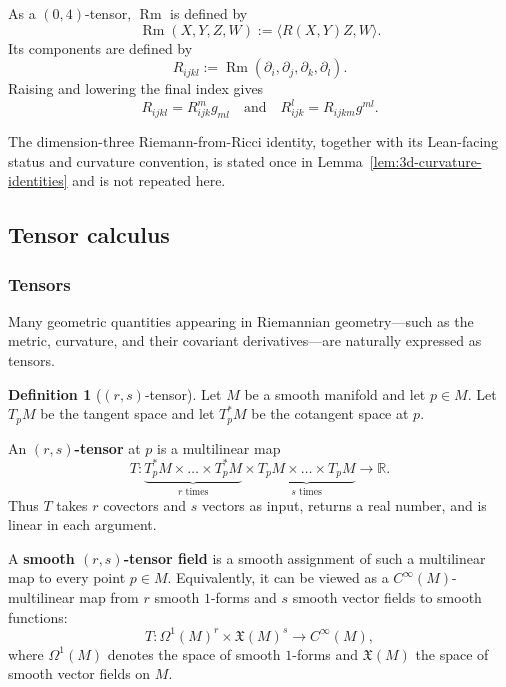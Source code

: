 \documentclass[11pt]{article}
\theoremstyle{plain}
\theoremstyle{definition}
\newtheorem{definition}[theorem]{Definition}
\theoremstyle{remark}
\newcommand{\Rm}{\operatorname{Rm}}
\begin{document}
As a $(0,4)$-tensor, $\Rm$ is defined by
\begin{equation}
    \Rm(X,Y,Z,W) := \langle R(X,Y)Z,W \rangle .
\end{equation}
Its components are defined by
\begin{equation}
    R_{ijkl} :=\Rm(\partial_i,\partial_j,\partial_k,\partial_l) .
\end{equation}
Raising and lowering the final index gives
\begin{equation}
    R_{ijkl}=R_{ijk}^m g_{ml} \quad \text{and} \quad R_{ijk}^l = R_{ijkm} g^{ml} .
\end{equation}

The dimension-three Riemann-from-Ricci identity, together with its Lean-facing
status and curvature convention, is stated once in
Lemma~\ref{lem:3d-curvature-identities} and is not repeated here.

\subsection{Tensor calculus}\label{subsec:TensorCalculus}

\subsubsection{Tensors}

Many geometric quantities appearing in Riemannian geometry---such as the metric,
curvature, and their covariant derivatives---are naturally expressed as tensors.

\begin{definition}[$(r,s)$-tensor]
\label{def:rs_tensor}
    Let $M$ be a smooth manifold and let $p\in M$.  Let $T_pM$ be
    the tangent space and let $T_p^*M$ be the cotangent space at $p$.

    An \textbf{$(r,s)$-tensor} at $p$ is a multilinear map
    \begin{equation}
        T: \underbrace{T_p^* M \times \dots \times T_p^* M}_{r \text{ times}} \times \underbrace{T_p M \times \dots \times T_p M}_{s \text{ times}} \to \mathbb{R}.
    \end{equation}
    Thus $T$ takes $r$ covectors and $s$ vectors as input, returns a real
    number, and is linear in each argument.

    A \textbf{smooth $(r,s)$-tensor field} is a smooth assignment of such a
    multilinear map to every point $p\in M$.  Equivalently, it can be viewed
    as a $C^\infty(M)$-multilinear map from $r$ smooth $1$-forms and $s$
    smooth vector fields to smooth functions:
    \begin{equation}
        T: \Omega^1(M)^r \times \mathfrak{X}(M)^s \to C^\infty(M),
    \end{equation}
where $\Omega^1(M)$ denotes the space of smooth $1$-forms and
$\mathfrak{X}(M)$ the space of smooth vector fields on $M$.
\end{definition}
\end{document}
